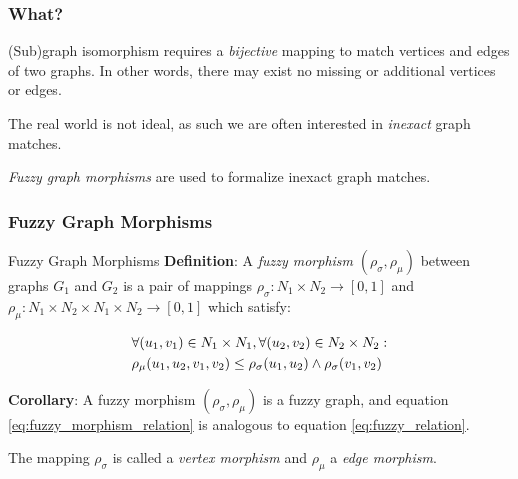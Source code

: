 



\begin{frame}
	\frametitle{What?}

	(Sub)graph isomorphism requires a \textit{bijective} mapping to match vertices and edges of two graphs. In other words, there may exist no missing or additional vertices or edges.

	\vspace*{2em}

	The real world is not ideal, as such we are often interested in \textit{inexact} graph matches.

	\vspace*{2em}

	\textit{Fuzzy graph morphisms} are used to formalize inexact graph matches.
\end{frame}

\begin{frame}
	\frametitle{Fuzzy Graph Morphisms}

	\begin{block}{Fuzzy Graph Morphisms}
		\textbf{Definition}: A \textit{fuzzy morphism} $(\rho_{\sigma}, \rho_{\mu})$ between graphs $G_1$ and $G_2$ is a pair of mappings $\rho_{\sigma}: N_1 \times N_2 \rightarrow [0, 1]$ and $\rho_{\mu}: N_1 \times N_2 \times N_1 \times N_2 \rightarrow [0, 1]$ which satisfy:

		\begin{equation}
			\begin{aligned}
				& \forall (u_1, v_1) \in N_1 \times N_1, \forall (u_2, v_2) \in N_2 \times N_2: \\
				& \rho_{\mu}(u_1, u_2, v_1, v_2) \le \rho_{\sigma}(u_1, u_2) \land \rho_{\sigma}(v_1, v_2)
			\end{aligned}
			\label{eq:fuzzy_morphism_relation}
		\end{equation}

		\textbf{Corollary}: A fuzzy morphism $(\rho_{\sigma}, \rho_{\mu})$ is a fuzzy graph, and equation \ref{eq:fuzzy_morphism_relation} is analogous to equation \ref{eq:fuzzy_relation}.

		\vspace*{2em}

		The mapping $\rho_{\sigma}$ is called a \textit{vertex morphism} and $\rho_{\mu}$ a \textit{edge morphism}.
	\end{block}
\end{frame}

